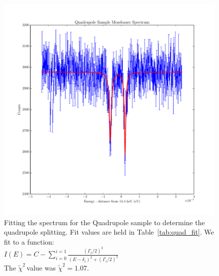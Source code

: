 \documentclass[reprint, nobibnotes, amssymb, amsmath, amsfonts, mathtools, mathrsfs, floatfix]{revtex4-1}
\newcommand{\redchi}{$\tilde{\chi}^2\,$}
\begin{document}
\begin{widetext}
      \begin{figure}[h]
        \centering
        \includegraphics[width=\linewidth]{../plots/quadrupole.pdf}
        \caption{Fitting the spectrum for the Quadrupole sample to determine the quadrupole splitting.  Fit values are held in Table~\ref{tab:quad_fit}.  We fit to a function: \\
          $I(E) = C - \sum\limits_{i = 0}^{i = 1}{ \frac{(\Gamma_i/2)^2}{(E-\delta_i)^2 + (\Gamma_i/2)^2} }$ \\
        The \redchi value was $\tilde{\chi}^2 = 1.07$.~\label{quadrupole_fit}}
      \end{figure}

    \end{widetext}

    
    
\end{document}
